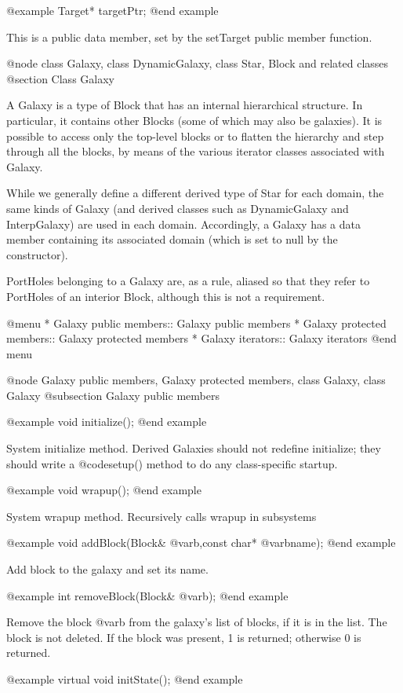 @example
Target* targetPtr;
@end example

This is a public data member, set by the setTarget public member
function.

@node class Galaxy, class DynamicGalaxy, class Star, Block and related classes
@section Class Galaxy

A Galaxy is a type of Block that has an internal hierarchical structure.
In particular, it contains other Blocks (some of which may also be
galaxies).  It is possible to access only the top-level blocks or to
flatten the hierarchy and step through all the blocks, by means
of the various iterator classes associated with Galaxy.

While we generally define a different derived type of Star for each
domain, the same kinds of Galaxy (and derived classes such as
DynamicGalaxy and InterpGalaxy) are used in each domain.  Accordingly,
a Galaxy has a data member containing its associated domain (which
is set to null by the constructor).

PortHoles belonging to a Galaxy are, as a rule, aliased so that they
refer to PortHoles of an interior Block, although this is not a
requirement.

@menu
* Galaxy public members::       Galaxy public members
* Galaxy protected members::    Galaxy protected members
* Galaxy iterators::            Galaxy iterators
@end menu

@node Galaxy public members, Galaxy protected members, class Galaxy, class Galaxy
@subsection Galaxy public members

@example
void initialize();
@end example

System initialize method.  Derived Galaxies should not redefine
initialize; they should write a @code{setup()} method to do any
class-specific startup.

@example
void wrapup();
@end example

System wrapup method.  Recursively calls wrapup in subsystems

@example
void addBlock(Block& @var{b},const char* @var{bname});
@end example

Add block to the galaxy and set its name.

@example
int removeBlock(Block& @var{b});
@end example

Remove the block @var{b} from the galaxy's list of blocks, if it is in
the list.  The block is not deleted.  If the block was present, 1 is
returned; otherwise 0 is returned.

@example
virtual void initState();
@end example

